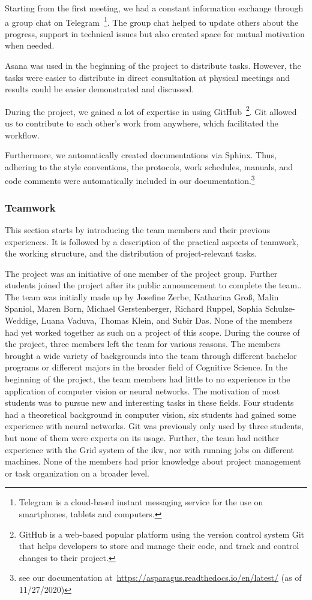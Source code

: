  Starting from the first meeting, we had a constant information exchange through a group chat on Telegram~\footnote{Telegram is a cloud-based instant messaging service for the use on smartphones, tablets and computers.}. The group chat helped to update others about the progress, support in technical issues but also created space for mutual motivation when needed.

Asana was used in the beginning of the project to distribute tasks. However, the tasks were easier to distribute in direct consultation at physical meetings and results could be easier demonstrated and discussed.

During the project, we gained a lot of expertise in using GitHub~\footnote{GitHub is a web-based popular platform using the version control system Git that helps developers to store and manage their code, and track and control changes to their project.}. Git allowed us to contribute to each other's work from anywhere, which facilitated the workflow.

Furthermore, we automatically created documentations via Sphinx. Thus, adhering to the style conventions, the protocols, work schedules, manuals, and code comments were automatically included in our documentation.\footnote{see our documentation at~\url{https://asparagus.readthedocs.io/en/latest/} (as of 11/27/2020)}


\subsubsection{Teamwork}
\label{subsec:Teamwork}

This section starts by introducing the team members and their previous experiences. It is followed by a description of the practical aspects of teamwork, the working structure, and the distribution of project-relevant tasks.

\bigskip
The project was an initiative of one member of the project group. Further students joined the project after its public announcement to complete the team.. The team was initially made up by Josefine Zerbe, Katharina Groß, Malin Spaniol, Maren Born, Michael Gerstenberger, Richard Ruppel, Sophia Schulze-Weddige, Luana Vaduva, Thomas Klein, and Subir Das. None of the members had yet worked together as such on a project of this scope. During the course of the project, three members left the team for various reasons.
The members brought a wide variety of backgrounds into the team through different bachelor programs or different majors in the broader field of Cognitive Science. In the beginning of the project, the team members had little to no experience in the application of computer vision or neural networks. The motivation of most students was to pursue new and interesting tasks in these fields. Four students had a theoretical background in computer vision, six students had gained some experience with neural networks. Git was previously only used by three students, but none of them were experts on its usage. Further, the team had neither experience with the Grid system of the \acrshort{ikw}, nor with running jobs on different machines. None of the members had prior knowledge about project management or task organization on a broader level.

